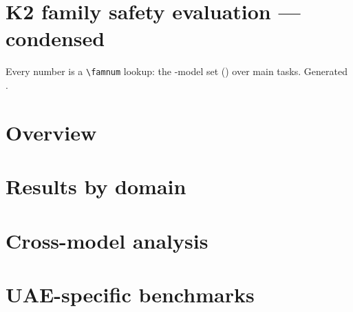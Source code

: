 \documentclass[10pt]{article}
\begin{document}
\section*{K2 family safety evaluation — condensed}

Every number is a \verb|\famnum| lookup: the -model set
() over  main tasks.
Generated .

\clearpage
\section*{Overview}




\clearpage
\section*{Results by domain}


















\clearpage
\section*{Cross-model analysis}



\clearpage
\section*{UAE-specific benchmarks}


\end{document}
